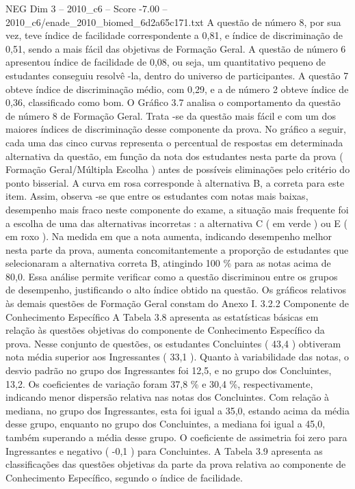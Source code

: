\begin{textsample}{NEG Dim 3 – 2010\_c6 – Score -7.00 – 2010\_c6/enade\_2010\_biomed\_6d2a65c171.txt}
A questão de número 8, por sua vez, teve índice de facilidade correspondente a 0,81, e índice de discriminação de 0,51, sendo a mais fácil das objetivas de Formação Geral.
A questão de número 6 apresentou índice de facilidade de 0,08, ou seja, um quantitativo pequeno de estudantes conseguiu resolvê -la, dentro do universo de participantes.
A questão 7 obteve índice de discriminação médio, com 0,29, e a de número 2 obteve índice de 0,36, classificado como bom.
O Gráfico 3.7 analisa o comportamento da questão de número 8 de Formação Geral.
Trata -se da questão mais fácil e com um dos maiores índices de discriminação desse componente da prova.
No gráfico a seguir, cada uma das cinco curvas representa o percentual de respostas em determinada alternativa da questão, em função da nota dos estudantes nesta parte da prova ( Formação Geral/Múltipla Escolha ) antes de possíveis eliminações pelo critério do ponto bisserial.
A curva em rosa corresponde à alternativa B, a correta para este item.
Assim, observa -se que entre os estudantes com notas mais baixas, desempenho mais fraco neste componente do exame, a situação mais frequente foi a escolha de uma das alternativas incorretas : a alternativa C ( em verde ) ou E ( em roxo ).
Na medida em que a nota aumenta, indicando desempenho melhor nesta parte da prova, aumenta concomitantemente a proporção de estudantes que selecionaram a alternativa correta B, atingindo 100 \% para as notas acima de 80,0.
Essa análise permite verificar como a questão discriminou entre os grupos de desempenho, justificando o alto índice obtido na questão.
Os gráficos relativos às demais questões de Formação Geral constam do Anexo I. 3.2.2 Componente de Conhecimento Específico A Tabela 3.8 apresenta as estatísticas básicas em relação às questões objetivas do componente de Conhecimento Específico da prova.
Nesse conjunto de questões, os estudantes Concluintes ( 43,4 ) obtiveram nota média superior aos Ingressantes ( 33,1 ).
Quanto à variabilidade das notas, o desvio padrão no grupo dos Ingressantes foi 12,5, e no grupo dos Concluintes, 13,2.
Os coeficientes de variação foram 37,8 \% e 30,4 \%, respectivamente, indicando menor dispersão relativa nas notas dos Concluintes.
Com relação à mediana, no grupo dos Ingressantes, esta foi igual a 35,0, estando acima da média desse grupo, enquanto no grupo dos Concluintes, a mediana foi igual a 45,0, também superando a média desse grupo.
O coeficiente de assimetria foi zero para Ingressantes e negativo ( -0,1 ) para Concluintes.
A Tabela 3.9 apresenta as classificações das questões objetivas da parte da prova relativa ao componente de Conhecimento Específico, segundo o índice de facilidade.

\end{textsample}
